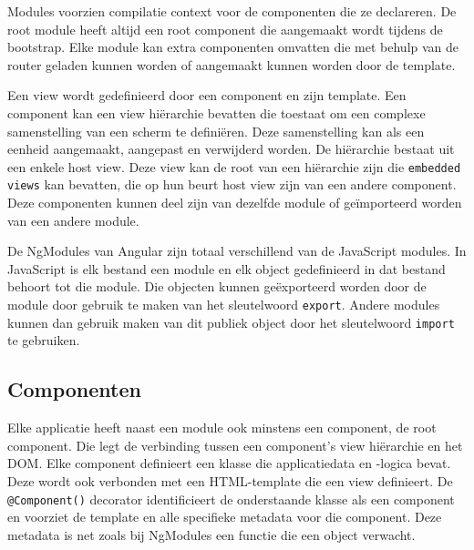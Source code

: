 
Modules voorzien compilatie context voor de componenten die ze declareren. De root module heeft altijd een root component die aangemaakt wordt tijdens de bootstrap. Elke module kan extra componenten omvatten die met behulp van de router geladen kunnen worden of aangemaakt kunnen worden door de template. \autocite{Angular2019b} 

Een view wordt gedefinieerd door een component en zijn template. Een component kan een view hiërarchie bevatten die toestaat om een complexe samenstelling van een scherm te definiëren. Deze samenstelling kan als een eenheid aangemaakt, aangepast en verwijderd worden. De hiërarchie bestaat uit een enkele host view. Deze view kan de root van een hiërarchie zijn die \texttt{embedded views} kan bevatten, die op hun beurt host view zijn van een andere component. Deze componenten kunnen deel zijn van dezelfde module of geïmporteerd worden van een andere module. \autocite{Angular2019b}

De NgModules van Angular zijn totaal verschillend van de JavaScript modules. In JavaScript is elk bestand een module en elk object gedefinieerd in dat bestand behoort tot die module. Die objecten kunnen geëxporteerd worden door de module door gebruik te maken van het sleutelwoord \texttt{export}. Andere modules kunnen dan gebruik maken van dit publiek object door het sleutelwoord \texttt{import} te gebruiken. \autocite{Angular2019b}

\subsection{Componenten}

Elke applicatie heeft naast een module ook minstens een component, de root component. Die legt de verbinding tussen een component's view hiërarchie en het DOM. Elke component definieert een klasse die applicatiedata en -logica bevat. Deze wordt ook verbonden met een HTML-template die een view definieert. De \texttt{@Component()} decorator identificieert de onderstaande klasse als een component en voorziet de template en alle specifieke metadata voor die component. Deze metadata is net zoals bij NgModules een functie die een object verwacht.  \autocite{Angular2019a}

